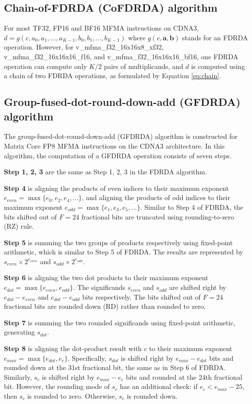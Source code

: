 \subsection{Chain-of-FDRDA (CoFDRDA) algorithm}

For most TF32, FP16 and BF16 MFMA instructions on CDNA3, $d=g(c, a_0, a_1, ..., a_{K-1}, b_0, b_1, ..., b_{K-1})$ where $g(c, \mathbf{a}, \mathbf{b})$ stands for an FDRDA operation. However, for v\_mfma\_f32\_16x16x8\_xf32, v\_mfma\_f32\_16x16x16\_f16, and v\_mfma\_f32\_16x16x16\_bf16, one FDRDA operation can compute only $K/2$ pairs of multiplicands, and $d$ is computed using a chain of two FDRDA operations, as formulated by Equation \ref{eq:chain}.

\subsection{Group-fused-dot-round-down-add (GFDRDA) algorithm}

The group-fused-dot-round-down-add (GFDRDA) algorithm is constructed for Matrix Core FP8 MFMA instructions on the CDNA3 architecture. In this algorithm, the computation of a GFDRDA operation consists of seven steps.

\textbf{Step 1, 2, 3} are the same as Step 1, 2, 3 in the FDRDA algorithm.

\textbf{Step 4} is aligning the products of even indices to their maximum exponent $e_{even}=\max \{e_0, e_2, e_4, ...\}$, and aligning the products of odd indices to their maximum exponent $e_{odd}=\max \{e_1, e_3, e_5, ...\}$. Similar to Step 4 of FDRDA, the bits shifted out of $F=24$ fractional bits are truncated using rounding-to-zero (RZ) rule.

\textbf{Step 5} is summing the two groups of products respectively using fixed-point arithmetic, which is similar to Step 5 of FDRDA. The results are represented by $s_{even}\times 2^{e_{even}}$ and $s_{odd}\times 2^{e_{odd}}$.

\textbf{Step 6} is aligning the two dot products to their maximum exponent $e_{dot}=\max\{e_{even}, e_{odd}\}$. The significands $s_{even}$ and $s_{odd}$ are shifted right by $e_{dot}-e_{even}$ and $e_{dot}-e_{odd}$ bits respectively. The bits shifted out of $F=24$ fractional bits are rounded down (RD) rather than rounded to zero.

\textbf{Step 7} is summing the two rounded significands using fixed-point arithmetic, generating $s_{dot}$.

\textbf{Step 8} is aligning the dot-product result with $c$ to their maximum exponent $e_{max}=\max \{e_{dot}, e_c\}$. Specifically, $s_{dot}$ is shifted right by $e_{max}-e_{dot}$ bits and rounded down at the 31st fractional bit, the same as in Step 6 of FDRDA. Similarly, $s_c$ is shifted right by $e_{max}-e_c$ bits and rounded at the 24th fractional bit. However, the rounding mode of $s_c$ has an additional check: if $e_c < e_{max}-25$, then $s_c$ is  rounded to zero. Otherwise, $s_c$ is rounded down.


